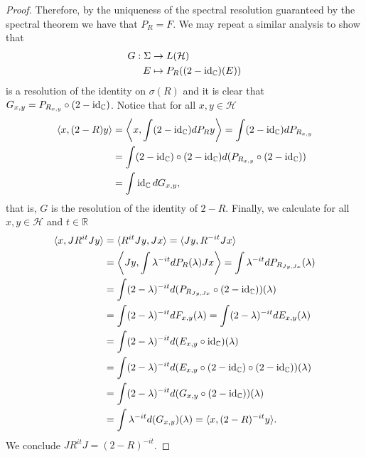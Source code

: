 \begin{proof}
Therefore, by the uniqueness of the spectral resolution guaranteed by the spectral theorem we have that $P_R=F$. We may repeat a similar analysis to show that
\begin{align}
\begin{split}
G:\Sigma&\rightarrow L(\mathcal{H}) \\
E&\mapsto P_R((2-\operatorname{id}_\mathbb{C})(E))
\end{split}
\end{align}
is a resolution of the identity on $\sigma(R)$ and it is clear that $G_{x,y}=P_{R_{x,y}}\circ (2-\operatorname{id}_\mathbb{C})$. Notice that for all $x,y\in\mathcal{H}$
\begin{align}
\begin{split}
\langle x, (2-R) y \rangle &= \left\langle x, \int (2-\operatorname{id}_\mathbb{C})dP_{R}y\right\rangle = \int (2-\operatorname{id}_\mathbb{C})dP_{R_{x,y}} \\
&= \int (2-\operatorname{id}_\mathbb{C})\circ (2-\operatorname{id}_\mathbb{C}) d(P_{R_{x,y}}\circ (2-\operatorname{id}_\mathbb{C})) \\
&= \int \operatorname{id}_\mathbb{C} dG_{x,y},
\end{split}
\end{align}
that is, $G$ is the resolution of the identity of $2-R$.
Finally, we calculate for all $x,y\in\mathcal{H}$ and $t\in\mathbb{R}$
\begin{align}
\begin{split}
\langle x, JR^{it}J y\rangle &= \langle R^{it}Jy,Jx\rangle = \langle Jy,R^{-it}Jx\rangle \\
&= \left\langle Jy, \int \lambda^{-it}dP_R(\lambda)Jx\right\rangle = \int \lambda^{-it}dP_{R_{Jy,Jx}}(\lambda) \\
&= \int (2-\lambda)^{-it}d(P_{R_{Jy,Jx}}\circ (2-\operatorname{id}_\mathbb{C}))(\lambda) \\
&= \int (2-\lambda)^{-it}dF_{x,y}(\lambda) = \int (2-\lambda)^{-it}dE_{x,y}(\lambda) \\
&= \int (2-\lambda)^{-it}d(E_{x,y}\circ\operatorname{id}_\mathbb{C})(\lambda) \\
&= \int (2-\lambda)^{-it}d(E_{x,y}\circ (2-\operatorname{id}_\mathbb{C})\circ (2-\operatorname{id}_\mathbb{C}))(\lambda) \\
&= \int (2-\lambda)^{-it}d(G_{x,y}\circ (2-\operatorname{id}_\mathbb{C}))(\lambda) \\
&= \int \lambda^{-it}d(G_{x,y})(\lambda) = \langle x, (2-R)^{-it}y\rangle.
\end{split}
\end{align}
We conclude $JR^{it}J=(2-R)^{-it}$.
\end{proof}

